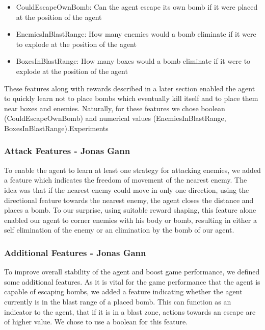 \documentclass{article}
\begin{document}
\begin{itemize}
    \item CouldEscapeOwnBomb: Can the agent escape its own bomb if it were placed at the position of the agent
    \item EnemiesInBlastRange: How many enemies would a bomb eliminate if it were to explode at the position of the agent
    \item BoxesInBlastRange: How many boxes would a bomb eliminate if it were to explode at the position of the agent
\end{itemize}

These features along with rewards described in a later section enabled the agent to quickly learn not to place bombs which eventually kill itself and to place them near boxes and enemies. Naturally, for these features we chose boolean (CouldEscapeOwnBomb) and numerical values (EnemiesInBlastRange, BoxesInBlastRange).Experiments

\subsubsection[Attack Features]{Attack Features {\small - Jonas Gann}}

To enable the agent to learn at least one strategy for attacking enemies, we added a feature which indicates the freedom of movement of the nearest enemy. The idea was that if the nearest enemy could move in only one direction, using the directional feature towards the nearest enemy, the agent closes the distance and places a bomb. To our surprise, using suitable reward shaping, this feature alone enabled our agent to corner enemies with his body or bomb, resulting in either a self elimination of the enemy or an elimination by the bomb of our agent.

\subsubsection[Additional Features]{Additional Features {\small - Jonas Gann}}

To improve overall stability of the agent and boost game performance, we defined some additional features. As it is vital for the game performance that the agent is capable of escaping bombs, we added a feature indicating whether the agent currently is in the blast range of a placed bomb. This can function as an indicator to the agent, that if it is in a blast zone, actions towards an escape are of higher value. We chose to use a boolean for this feature.
\end{document}
